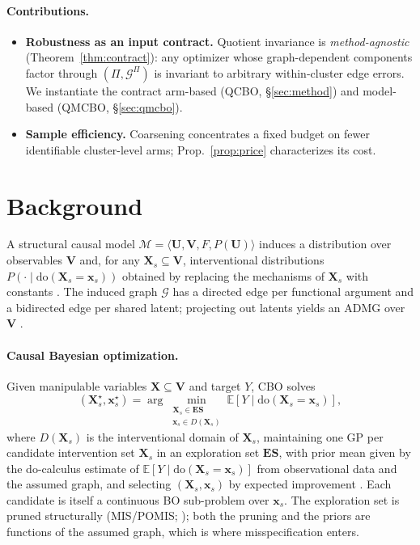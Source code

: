 \documentclass[twoside]{article}
\newcommand{\E}{\mathbb{E}}
\newcommand{\doo}{\mathrm{do}}
\newcommand{\QCBO}{\textsc{QCBO}}
\newcommand{\QMCBO}{\textsc{QMCBO}}
\newcommand{\CBO}{\textsc{CBO}}
\newcommand{\Gg}{\mathcal{G}}
\newcommand{\Gq}{\mathcal{G}^{\Pi}}
\newcommand{\ES}{\mathbf{ES}}
\begin{document}
\paragraph{Contributions.}
\begin{itemize}[leftmargin=1.2em,itemsep=1pt,topsep=2pt]
  \item \textbf{Robustness as an input contract.} Quotient invariance is \emph{method-agnostic} (Theorem~\ref{thm:contract}): any optimizer whose graph-dependent components factor through $(\Pi,\Gq)$ is invariant to arbitrary within-cluster edge errors. We instantiate the contract arm-based (\QCBO{}, \S\ref{sec:method}) and model-based (\QMCBO{}, \S\ref{sec:qmcbo}).
  \item \textbf{Sample efficiency.} Coarsening concentrates a fixed budget on fewer identifiable cluster-level arms; Prop.~\ref{prop:price} characterizes its cost.
\end{itemize}

\section{Background}
\label{sec:background}

A structural causal model $\mathcal{M}=\langle\mathbf{U},\mathbf{V},F, P(\mathbf{U})\rangle$ induces a distribution over observables $\mathbf{V}$ and, for any $\mathbf{X}_s\subseteq\mathbf{V}$, interventional distributions $P(\cdot\mid\doo(\mathbf{X}_s=\mathbf{x}_s))$ obtained by replacing the mechanisms of $\mathbf{X}_s$ with constants \citep{pearl2009causality}. The induced graph $\Gg$ has a directed edge per functional argument and a bidirected edge per shared latent; projecting out latents yields an ADMG over $\mathbf{V}$ \citep{lee2019latent}. 

\paragraph{Causal Bayesian optimization.}
Given manipulable variables $\mathbf{X}\subseteq\mathbf{V}$ and target $Y$,
\CBO{} \citep{aglietti2020causal} solves
\begin{equation}
  \label{eq:cbo_obj}
  (\mathbf{X}_s^\star,\mathbf{x}_s^\star) =
  \arg\min_{\substack{\mathbf{X}_s\in\ES\\ \mathbf{x}_s\in D(\mathbf{X}_s)}} \E\!\left[Y\mid\doo(\mathbf{X}_s=\mathbf{x}_s)\right],
\end{equation}
where $D(\mathbf{X}_s)$ is the interventional domain of $\mathbf{X}_s$, maintaining one GP per candidate intervention set $\mathbf{X}_s$ in an exploration set $\ES$, with prior mean given by the do-calculus estimate of $\E[Y\mid\doo(\mathbf{X}_s=\mathbf{x}_s)]$ from observational data and the assumed graph, and selecting $(\mathbf{X}_s,\mathbf{x}_s)$ by expected improvement \citep{garnett2023bayesian}. Each candidate is itself a continuous BO sub-problem over $\mathbf{x}_s$. The exploration set is pruned structurally (MIS/POMIS; \citealp{lee2018structural}); both the pruning and the priors are functions of the assumed graph, which is where misspecification enters.
\end{document}
